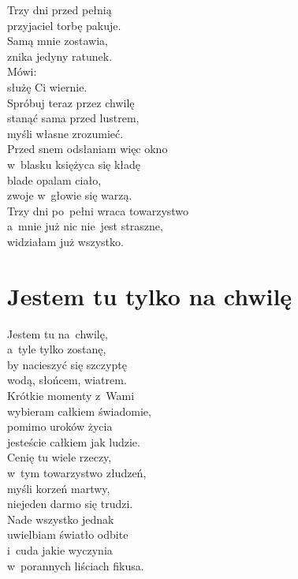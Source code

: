 \documentclass[12pt, a4paper]{memoir}
\renewenvironment{verse}{%
  \par\vspace{\baselineskip}\raggedright
}{
  \par\vspace{\baselineskip}
}
\begin{document}
\begin{verse}
Trzy dni przed pełnią\\
przyjaciel torbę pakuje.\\
Samą mnie zostawia,\\
znika jedyny ratunek.\\[\baselineskip]
Mówi:\\
służę Ci wiernie.\\
Spróbuj teraz przez chwilę\\
stanąć sama przed lustrem,\\
myśli własne zrozumieć.\\[\baselineskip]
Przed snem odsłaniam więc okno\\
w~blasku księżyca się kładę\\
blade opalam ciało,\\
zwoje w~głowie się warzą.\\[\baselineskip]
Trzy dni po~pełni wraca towarzystwo\\
a~mnie już nic nie~jest straszne,\\
widziałam już wszystko.
\end{verse}

\clearpage

\section{Jestem tu tylko na chwilę}

\begin{verse}
Jestem tu na~chwilę,\\
a~tyle tylko zostanę,\\
by nacieszyć się szczyptę\\
wodą, słońcem, wiatrem.\\[\baselineskip]
Krótkie momenty z~Wami\\
wybieram całkiem świadomie,\\
pomimo uroków życia\\
jesteście całkiem jak ludzie.\\[\baselineskip]
Cenię tu wiele rzeczy,\\
w~tym towarzystwo złudzeń,\\
myśli korzeń martwy,\\
niejeden darmo się trudzi.\\[\baselineskip]
Nade wszystko jednak\\
uwielbiam światło odbite\\
i~cuda jakie wyczynia\\
w~porannych liściach fikusa.
\end{verse}
\clearpage
\end{document}
